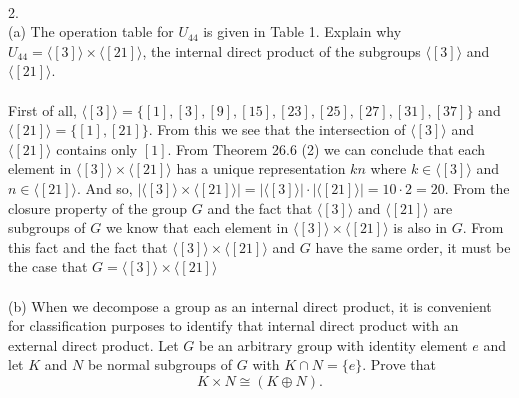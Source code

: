 \documentclass[11pt]{article}
\begin{document}
~

2.\\
(a) The operation table for $U_{44}$ is given in Table 1. Explain why $U_{44}=\langle [3] \rangle \times \langle [21] \rangle$, the internal direct product of the subgroups $\langle [3] \rangle$ and $\langle [21] \rangle$.\\
~\\
First of all, $\langle [3] \rangle = \{[1],[3],[9],[15],[23],[25],[27],[31],[37]\}$ and $\langle [21] \rangle = \{[1],[21]\}$. 
From this we see that the intersection of $\langle [3] \rangle$ and $\langle [21] \rangle$ contains only $[1]$. 
From Theorem 26.6 (2) we can conclude that each element in $\langle [3] \rangle \times \langle [21] \rangle$ has a unique representation $kn$ 
where $k\in \langle [3] \rangle$ and $n\in \langle [21] \rangle$. And so, 
$ |\langle [3] \rangle \times \langle [21] \rangle| = |\langle [3] \rangle|\cdot |\langle [21] \rangle | = 10\cdot 2 = 20. $ 
From the closure property of the group $G$ and the fact that $\langle [3] \rangle $ and $ \langle [21] \rangle$ are subgroups of $G$ we know that each element in $ \langle [3] \rangle \times \langle [21] \rangle $ is also in $G$. From this fact and the fact that $ \langle [3] \rangle \times \langle [21] \rangle $ and $G$ have the same order, it must be the case that $ G= \langle [3] \rangle \times \langle [21] \rangle $\\
~\\
(b) When we decompose a group as an internal direct product, it is convenient for classification purposes to identify that internal direct product with an external direct product. Let $G$ be an arbitrary group with identity element $e$ and let $K$ and $N$ be normal subgroups of $G$ with $K \cap N = \{e\}$. Prove that 
\[ K \times N \cong (K \oplus N).\]
\newcommand{\dom}{\ensuremath{K \oplus N}}
\newcommand{\img}{\ensuremath{K \times N}}
\end{document}
